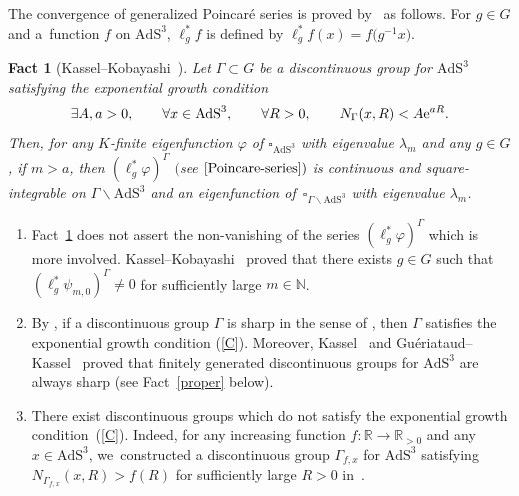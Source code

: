 \documentclass[10pt,a4paper]{amsart}
\numberwithin{equation}{section}
\newtheorem{Fact}[Theorem]{Fact}
 { \theoremstyle{definition}
\newtheorem{Definition}[Theorem]{Definition}
\newtheorem{Note}[Theorem]{Note}
\newtheorem{Example}[Theorem]{Example}
\newtheorem{Remark}[Theorem]{Remark}
\newtheorem{Setting}[Theorem]{Setting}
\newtheorem{Notation}[Theorem]{Notation}
}
\begin{document}
The convergence of generalized Poincar\'e series is proved by~\cite{KaKob16} as follows.
For $g \in G$ and a~function $f$ on $\mathrm{AdS}^{3}$,
$\ell_{g}^{*}f$ is defined by $\ell_{g}^{*}f(x)=f\big(g^{-1}x\big)$.
\begin{Fact}[Kassel--Kobayashi~\cite{KaKob16}]\label{Poincare}
Let $\Gamma \subset G$ be a discontinuous group for $\mathrm{AdS}^{3}$
satisfying the exponential growth condition
\begin{gather}\label{C}
\exists A,a > 0,\qquad
\forall x\in \mathrm{AdS}^{3},\qquad
\forall R>0, \qquad
N_{\Gamma}(x,R) < A{\rm e}^{aR}.
\end{gather}
Then, for any $K$-finite eigenfunction $\varphi$ of $\square_{\mathrm{AdS}^{3}}$ with eigenvalue
$\lambda_{m}$
and any $g\in G$,
if $m > a$, then
$(\ell_{g}^{*}\varphi)^{\Gamma}$ $($see $\eqref{Poincare-series})$ is continuous and square-integrable on
$\Gamma\backslash\mathrm{AdS}^{3}$ and
an eigenfunction of~$\square_{\Gamma\backslash\mathrm{AdS}^{3}}$ with eigenvalue
$\lambda_{m}$.
\end{Fact}

\begin{Remark}\label{remPoincare}\quad
\begin{enumerate}\itemsep=0pt
\item[(1)]
Fact~\ref{Poincare} does not assert the non-vanishing of the series
$(\ell_{g}^{*}\varphi)^{\Gamma}$ which is more involved.
Kassel--Kobayashi~\cite{KaKob16} proved that
there exists $g\in G$ such that
$(\ell^{*}_{g}\psi_{m,0})^{\Gamma}\neq 0$
for sufficiently large $m \in \mathbb{N}$.
\item[(2)]
By \cite[Lemma~4.6.4]{KaKob16}, if a discontinuous group $\Gamma$ is sharp
in the sense of \cite[Definition~4.2]{KaKob16},
then $\Gamma$ satisfies the exponential growth condition (\ref{C}).
Moreover, Kassel~\cite{Ka09} and Gu\'eriataud--Kassel~\cite{GuKa17}
proved that finitely generated discontinuous groups for $\mathrm{AdS}^{3}$
are always sharp (see Fact~\ref{proper} below).
\item[(3)]
There exist discontinuous groups
which do not satisfy the exponential growth condition~(\ref{C}).
Indeed, for any increasing function $f\colon\mathbb{R}\rightarrow \mathbb{R}_{>0}$
and any $x\in\mathrm{AdS}^{3}$,
we~con\-st\-ructed
a discontinuous group $\Gamma_{f,x}$ for $\mathrm{AdS}^{3}$
satisfying $N_{\Gamma_{f,x}}(x,R) > f(R)$ for sufficiently large $R>0$ in~\cite{Kan19}.
\end{enumerate}
\end{Remark}
\end{document}
